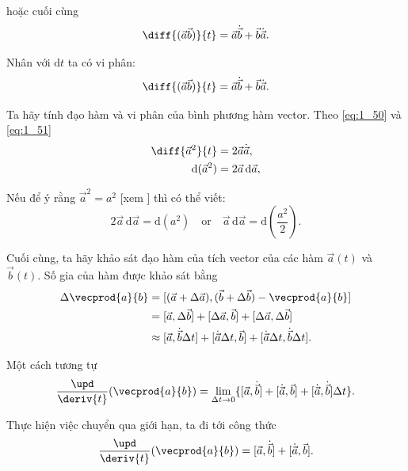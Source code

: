 \noindent
hoặc cuối cùng
\begin{equation}\label{eq:1_50}
\diff{(\vec{a}\vec{b})}{t} = \vec{a}\dot{\vec{b}} + \vec{b}\dot{\vec{a}}.
\end{equation}

\noindent
Nhân  với $\mathrm{d}t$ ta có vi phân:
\begin{equation}\label{eq:1_51}
\diff{(\vec{a}\vec{b})}{t} = \vec{a}\dot{\vec{b}} + \vec{b}\dot{\vec{a}}.
\end{equation}

Ta hãy tính đạo hàm và vi phân của bình phương hàm vector. Theo \eqref{eq:1_50} và \eqref{eq:1_51}
\begin{align}
\diff{\vec{a}^2}{t} &= 2\vec{a}\dot{\vec{a}},\label{eq:1_52}\\
\mathrm{d}(\vec{a}^2) &= 2\vec{a}\,\mathrm{d}\vec{a},\label{eq:1_53}
\end{align}

\noindent
Nếu để ý rằng $\vec{a}^2 = a^2$ [xem ] thì có thể viết:
\begin{equation}\label{eq:1_54}
2\vec{a}\,\mathrm{d}\vec{a} = \mathrm{d}(a^2) \quad \text{or} \quad \vec{a}\,\mathrm{d}\vec{a} = \mathrm{d}\left(\frac{a^2}{2}\right).
\end{equation}

Cuối cùng, ta hãy khảo sát đạo hàm của tích vector của các hàm $\vec{a}(t)$ và $\vec{b}(t)$. Số gia của hàm được khảo sát bằng
\begin{align*}
\Delta\vecprod{a}{b} &= [(\vec{a} + \Delta\vec{a}),(\vec{b} + \Delta\vec{b}) - \vecprod{a}{b}]\\
&= [\vec{a},\Delta\vec{b}] + [\Delta\vec{a},\vec{b}] + [\Delta\vec{a},\Delta\vec{b}]\\
&\approx [\vec{a},\dot{\vec{b}}\Delta t] + [\dot{\vec{a}}\Delta t,\vec{b}] + [\dot{\vec{a}}\Delta t,\dot{\vec{b}}\Delta t].
\end{align*}

\noindent
Một cách tương tự
\begin{equation*}
\frac{\upd}{\deriv{t}}(\vecprod{a}{b}) = \lim_{\Delta t\to 0} \{[\vec{a},\dot{\vec{b}}] + [\dot{\vec{a}},\vec{b}] + [\dot{\vec{a}},\dot{\vec{b}}]\Delta t\}.
\end{equation*}

\noindent
Thực hiện việc chuyển qua giới hạn, ta đi tới công thức
\begin{equation}\label{eq:1_55}
\frac{\upd}{\deriv{t}}(\vecprod{a}{b}) = [\vec{a},\dot{\vec{b}}] + [\dot{\vec{a}},\vec{b}].
\end{equation}

